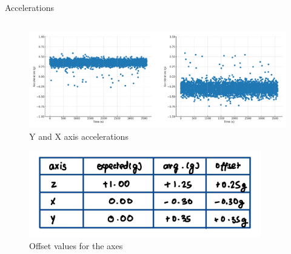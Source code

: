 \begin{frame}{Accelerations}
\begin{columns}[onlytextwidth]
        \begin{column}{0.54\textwidth}
            \vspace{-0.3em}
            \begin{figure}
                \centering
                \includegraphics[height=0.4\textheight,width=1.1\textwidth,keepaspectratio]{images/xy-axis-acceleration.png}
                \caption{Y and X axis accelerations}
            \end{figure}
            \vspace{-1.8em} 
            \begin{figure}
                \centering
                \includegraphics[height=0.25\textheight,width=0.9\textwidth,keepaspectratio]{images/table_axes.jpg}
                \caption{Offset values for the axes}
            \end{figure}
        \end{column}
    \end{columns}
\end{frame}


